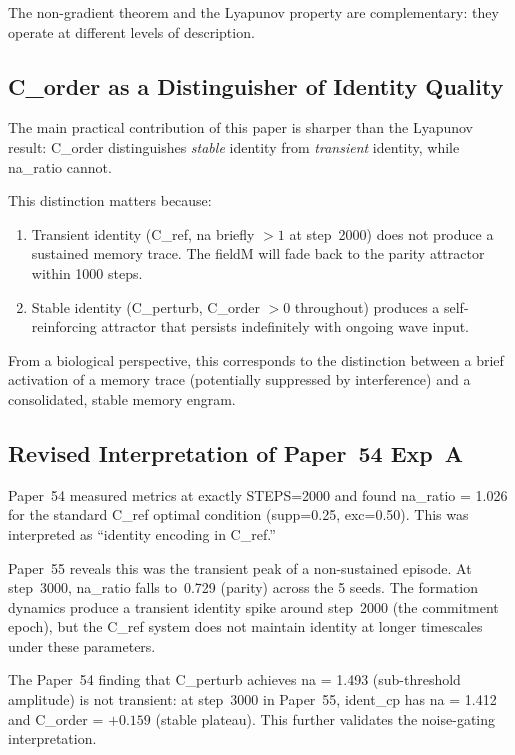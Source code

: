 \documentclass[11pt,a4paper]{article}
\begin{document}
The non-gradient theorem and the Lyapunov property are complementary:
they operate at different levels of description.

\subsection{C\_order as a Distinguisher of Identity Quality}

The main practical contribution of this paper is sharper than the Lyapunov
result: C\_order distinguishes \emph{stable} identity from \emph{transient} identity,
while na\_ratio cannot.

This distinction matters because:
\begin{enumerate}
  \item Transient identity (C\_ref, na briefly $> 1$ at step~2000) does not
    produce a sustained memory trace.
    The fieldM will fade back to the parity attractor within 1000 steps.
  \item Stable identity (C\_perturb, C\_order $> 0$ throughout) produces a
    self-reinforcing attractor that persists indefinitely with ongoing wave input.
\end{enumerate}

From a biological perspective, this corresponds to the distinction between
a brief activation of a memory trace (potentially suppressed by interference)
and a consolidated, stable memory engram.

\subsection{Revised Interpretation of Paper~54 Exp~A}

Paper~54 measured metrics at exactly STEPS=2000 and found na\_ratio = 1.026 for
the standard C\_ref optimal condition (supp=0.25, exc=0.50).
This was interpreted as ``identity encoding in C\_ref.''

Paper~55 reveals this was the transient peak of a non-sustained episode.
At step~3000, na\_ratio falls to~0.729 (parity) across the 5 seeds.
The formation dynamics produce a transient identity spike around step~2000
(the commitment epoch), but the C\_ref system does not maintain identity at
longer timescales under these parameters.

The Paper~54 finding that C\_perturb achieves na = 1.493 (sub-threshold amplitude)
is not transient: at step~3000 in Paper~55, ident\_cp has na = 1.412
and C\_order = $+0.159$ (stable plateau).
This further validates the noise-gating interpretation.
\end{document}
